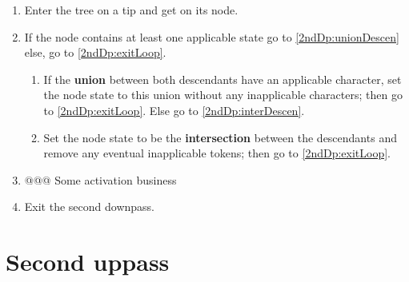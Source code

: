 \documentclass[a4paper,12pt]{article}
\begin{document}
\begin{enumerate}
    \item Enter the tree on a tip and get on its node.
    \item If the node contains at least one applicable state go to \ref{2ndDp:unionDescen} else, go to \ref{2ndDp:exitLoop}.
    \begin{enumerate}
        \item \label{2ndDp:unionDescen} If the \textbf{union} between both descendants have an applicable character, set the node state to this union without any inapplicable characters; then go to \ref{2ndDp:exitLoop}. Else go to \ref{2ndDp:interDescen}.
        \item \label{2ndDp:interDescen} Set the node state to be the \textbf{intersection} between the descendants and remove any eventual inapplicable tokens; then go to \ref{2ndDp:exitLoop}.
    \end{enumerate}
    \item @@@ Some activation business
    \item \label{2ndDp:exitLoop} Exit the second downpass.
\end{enumerate}

\section{Second uppass}
\end{document}
